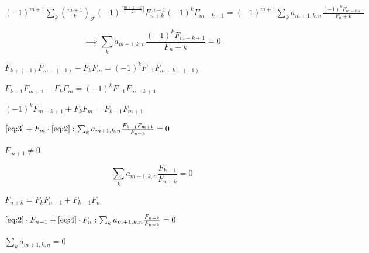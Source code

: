 \documentclass{article}
\begin{document}
$(-1)^{m+1} \sum_{k} \binom{m+1}{k}_{\mathcal{F}} (-1)^{\lceil \frac{m + 1 -k}{2}\rceil}F_{n+k}^{m-1}(-1)^kF_{m-k+1} = (-1)^{m+1} \sum_{k} a_{m+1,k,n}\frac{(-1)^kF_{m-k+1}}{F_n+k}$

\[\implies \sum_{k} a_{m+1,k,n}\frac{(-1)^kF_{m-k+1}}{F_n+k} = 0 \tag{3}\label{eq:3}\]

$F_{k+(-1)}F_{m-(-1)}-F_{k}F_m = (-1)^kF_{-1}F_{m-k-(-1)}$

$F_{k-1}F_{m+1} - F_kF_m = (-1)^kF_{-1}F_{m-k+1}$

$(-1)^kF_{m-k+1} + F_k F_m = F_{k-1}F_{m+1}$

$\eqref{eq:3} + F_m \cdot \eqref{eq:2}: \sum_k a_{m+1,k,n}\frac{F_{k-1}F_{m+1}}{F_{n+k}} = 0$

$F_{m+1} \neq 0$

\[\sum_k a_{m+1,k,n}\frac{F_{k-1}}{F_{n+k}} = 0 \tag{4}\label{eq:4}\]

$F_{n+k} = F_kF_{n+1} + F_{k-1}F_n$

$\eqref{eq:2}\cdot F_{n+1} + \eqref{eq:4} \cdot F_{n}: \sum_k a_{m+1,k,n}\frac{F_{n+k}}{F_{n+k}} = 0$

$\sum_k a_{m+1,k,n} = 0$
\end{document}

